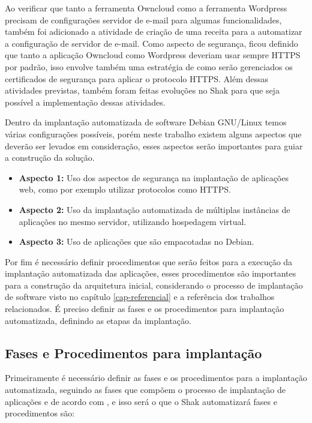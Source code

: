 Ao verificar que tanto a ferramenta Owncloud como a ferramenta Wordpress precisam
de configurações servidor de e-mail para algumas funcionalidades, também foi adicionado
a atividade de criação de uma receita para a automatizar a configuração de
servidor de e-mail. Como aspecto de segurança, ficou definido que tanto a aplicação
Owncloud como Wordpress deveriam usar sempre HTTPS por padrão, isso envolve também
uma estratégia de como serão gerenciados os certificados de segurança para aplicar
o protocolo HTTPS. Além dessas atividades previstas, também foram feitas evoluções
no Shak para que seja possível a implementação dessas atividades.

Dentro da implantação automatizada de software Debian GNU/Linux temos várias
configurações possíveis, porém neste trabalho existem alguns aspectos que deverão ser levados em
consideração, esses aspectos serão importantes para guiar a construção da solução.

\begin{itemize}
  \item  \textbf{Aspecto 1:} Uso dos aspectos de segurança na implantação de aplicações web,
 como por exemplo utilizar protocolos como HTTPS.
  \item  \textbf{Aspecto 2:} Uso da implantação automatizada de múltiplas instâncias de
   aplicações no mesmo servidor, utilizando hospedagem virtual.
  \item  \textbf{Aspecto 3:} Uso de aplicações que são empacotadas no Debian.
\end{itemize}

Por fim é necessário definir procedimentos que serão
feitos para a execução da implantação automatizada das aplicações, esses procedimentos são
importantes para a construção da arquitetura inicial, considerando
o processo de implantação de software visto no capítulo \ref{cap-referencial}
e a referência dos trabalhos relacionados. É preciso definir as fases e os
procedimentos para implantação automatizada, definindo as etapas
da implantação.

\subsection{Fases e Procedimentos para implantação}

Primeiramente é necessário definir as fases e os procedimentos para a implantação automatizada,
seguindo as fases que compõem o processo de implantação de aplicações e de acordo
com \cite{omg2006}, e isso será o que o Shak automatizará fases e procedimentos são:

